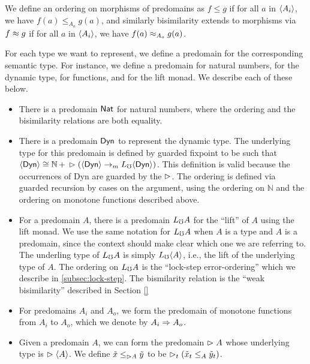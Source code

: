 
We define an ordering on morphisms of predomains as
$f \le g$ if for all $a$ in $\langle {A_i} \rangle$, we have $f(a) \le_{A_o} g(a)$,
and similarly bisimilarity extends to morphisms via
$f \approx g$ if for all $a$ in $\langle {A_i} \rangle$, we have $f(a) \approx_{A_o} g(a)$.

For each type we want to represent, we define a predomain for the corresponding semantic
type. For instance, we define a predomain for natural numbers, for the
dynamic type, for functions, and for the lift monad. We
describe each of these below.

\begin{itemize}
  \item There is a predomain $\mathsf{Nat}$ for natural numbers, where the ordering and the
  bisimilarity relations are both equality.
  
  \item There is a predomain $\mathsf{Dyn}$ to represent the dynamic type. The underlying type
  for this predomain is defined by guarded fixpoint to be such that
  $\langle {\mathsf{Dyn}} \rangle \cong \mathbb{N}\, +\, \vartriangleright (\langle {\mathsf{Dyn}} \rangle \to_m L_\mho \langle {\mathsf{Dyn}} \rangle)$.
  This definition is valid because the occurrences of Dyn are guarded by the $\vartriangleright$.
  The ordering is defined via guarded recursion by cases on the argument, using the
  ordering on $\mathbb{N}$ and the ordering on monotone functions described above.

  \item For a predomain $A$, there is a predomain $L_\mho A$ for the ``lift'' of $A$
  using the lift monad. We use the same notation for $L_\mho A$ when $A$ is a type
  and $A$ is a predomain, since the context should make clear which one we are referring to.
  The underling type of $L_\mho A$ is simply $L_\mho \langle {A} \rangle$, i.e., the lift of the underlying
  type of $A$.
  The ordering on $L_\mho A$ is the ``lock-step error-ordering'' which we describe in
  \ref{subsec:lock-step}. The bismilarity relation is the ``weak bisimilarity''
  described in Section \ref{}

  \item For predomains $A_i$ and $A_o$, we form the predomain of monotone functions
  from $A_i$ to $A_o$, which we denote by $A_i \Rightarrow A_o$.

  \item Given a predomain $A$, we can form the predomain $\vartriangleright A$ whose underlying
  type is $\vartriangleright \langle {A} \rangle$. We define $\tilde{x} \le_{\vartriangleright A} \tilde{y}$ to be
  $\vartriangleright_t (\tilde{x}_t \le_A \tilde{y}_t)$.
\end{itemize}

